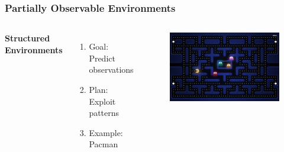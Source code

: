 \documentclass{beamer}
\begin{document}
\begin{frame}
\frametitle{Partially Observable Environments}
\begin{columns}[c] %

\textbf{Structured Environments}
\begin{enumerate}
\item Goal: Predict observations
\item Plan: Exploit patterns
\item Example: Pacman

\end{enumerate}

\begin{figure}
\includegraphics[width=1.0\linewidth]{lucasplots/pac-man.jpg}
\end{figure}

\end{columns}
\end{frame}

\end{document}
